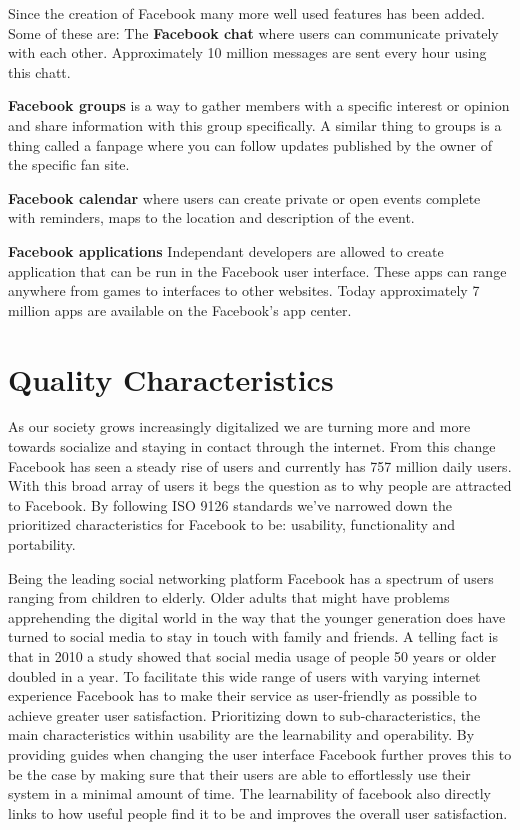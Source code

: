 \documentclass[conference]{IEEEtran}
\begin{document}
Since the creation of Facebook many more well used features has been added. Some of these are:
The {\bf Facebook chat} where users can communicate privately with each other. Approximately 10 million messages are sent every hour using this chatt. \cite{StatisticBrain}

{\bf Facebook groups} is a way to gather members with a specific interest or opinion and share information with this group specifically. A similar thing to groups is a thing called a fanpage where you can follow updates published by the owner of the specific fan site.

{\bf Facebook calendar} where users can create private or open events complete with reminders, maps to the location and description of the event.

{\bf Facebook applications} Independant developers are allowed to create application that can be run in the Facebook user interface. These apps can range anywhere from games to interfaces to other websites. Today approximately 7 million apps are available on the  Facebook's app center.\cite{StatisticBrain}

\section{Quality Characteristics}
\label{quality}

As our society grows increasingly digitalized we are turning more and more towards socialize and staying in contact through the internet. From this change Facebook has seen a steady rise of users\cite{foster} and currently has 757 million daily users\cite{smith2014}. With this broad array of users it begs the question as to why people are attracted to Facebook. By following ISO 9126 standards we’ve narrowed down the prioritized characteristics for Facebook to be: usability, functionality and portability. 

Being the leading social networking platform Facebook has a spectrum of users ranging from children to elderly. Older adults that might have problems apprehending the digital world in the way that the younger generation does have turned to social media to stay in touch with family and friends. A telling fact is that in 2010 a study showed that social media usage of people 50 years or older doubled in a year\cite{madden2010}. To facilitate this wide range of users with varying internet experience Facebook has to make their service as user-friendly as possible to achieve greater user satisfaction\cite{rauniar2012}. Prioritizing down to sub-characteristics, the main characteristics within usability are the learnability and operability. By providing guides when changing the user interface Facebook further proves this to be the case by making sure that their users are able to effortlessly use their system in a minimal amount of time.
The learnability of facebook also directly links to how useful people find it to be and improves the overall user satisfaction\cite{choi2014}.
\end{document}
